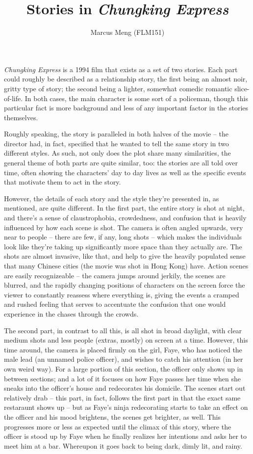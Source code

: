 \documentclass{article}
\title{Stories in \emph{Chungking Express}}
\author{Marcus Meng (FLM151)}
\begin{document}
\maketitle

\emph{Chungking Express} is a 1994 film that exists as a set of two stories.
Each part could roughly be described as a relationship story, the first being an almost noir, gritty type of story;
the second being a lighter, somewhat comedic romantic slice-of-life.
In both cases, the main character is some sort of a policeman, though this particular fact is more background and less of any important factor in the stories themselves.

Roughly speaking, the story is paralleled in both halves of the movie -- the director had, in fact, specified that he wanted to tell the same story in two different styles.
As such, not only does the plot share many similarities, the general theme of both parts are quite similar, too:
the stories are all told over time, often showing the characters' day to day lives as well as the specific events that motivate them to act in the story.

However, the details of each story and the style they're presented in, as mentioned, are quite different.
In the first part, the entire story is shot at night, and there's a sense of claustrophobia, crowdedness, and confusion that is heavily influenced by how each scene is shot.
The camera is often angled upwards, very near to people -- there are few, if any, long shots -- which makes the individuals look like they're taking up significantly more space than they actually are.
The shots are almost invasive, like that, and help to give the heavily populated sense that many Chinese cities (the movie was shot in Hong Kong) have.
Action scenes are easily recognizeable -- the camera jumps around jerkily, the scenes are blurred, and the rapidly changing positions of characters on the screen force the viewer to constantly reassess where everything is, giving the events a cramped and rushed feeling that serves to accentuate the confusion that one would experience in the chases through the crowds.

The second part, in contrast to all this, is all shot in broad daylight, with clear medium shots and less people (extras, mostly) on screen at a time.
However, this time around, the camera is placed firmly on the girl, Faye, who has noticed the male lead (an unnamed police officer), and wishes to catch his attention (in her own weird way).
For a large portion of this section, the officer only shows up in between sections; and a lot of it focuses on how Faye passes her time when she sneaks into the officer's house and redecorates his domicile.
The scenes start out relatively drab -- this part, in fact, follows the first part in that the exact same restaraunt shows up -- but as Faye's ninja redecorating starts to take an effect on the officer and his mood brightens, the scenes get brighter, as well.
This progresses more or less as expected until the climax of this story, where the officer is stood up by Faye when he finally realizes her intentions and asks her to meet him at a bar.
Whereupon it goes back to being dark, dimly lit, and rainy.
\end{document}
